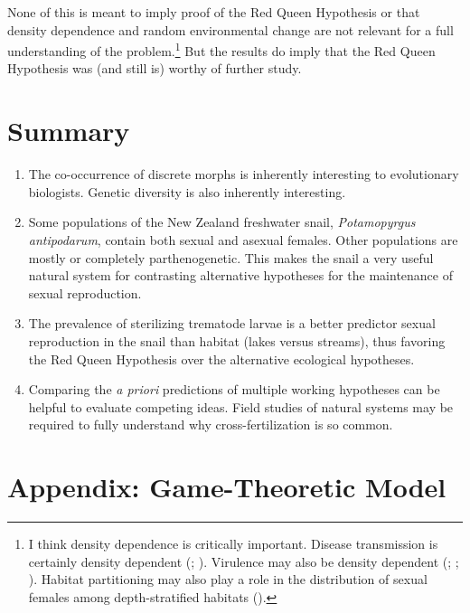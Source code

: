 \documentclass[
  letterpaper,
]{book}
\begin{document}
None of this is meant to imply proof of the Red Queen Hypothesis or that
density dependence and random environmental change are not relevant for
a full understanding of the problem.\footnote{I think density dependence
  is critically important. Disease transmission is certainly density
  dependent (;
  ). Virulence may also be
  density dependent (;
  ;
  ). Habitat partitioning may
  also play a role in the distribution of sexual females among
  depth-stratified habitats ().} But the results do imply that the Red Queen Hypothesis
was (and still is) worthy of further study.

\section{Summary}\label{summary-2}

\begin{enumerate}
\def\labelenumi{\arabic{enumi}.}
\item
  The co-occurrence of discrete morphs is inherently interesting to
  evolutionary biologists. Genetic diversity is also inherently
  interesting.
\item
  Some populations of the New Zealand freshwater snail,
  \emph{Potamopyrgus antipodarum}, contain both sexual and asexual
  females. Other populations are mostly or completely parthenogenetic.
  This makes the snail a very useful natural system for contrasting
  alternative hypotheses for the maintenance of sexual reproduction.
\item
  The prevalence of sterilizing trematode larvae is a better predictor
  sexual reproduction in the snail than habitat (lakes versus streams),
  thus favoring the Red Queen Hypothesis over the alternative ecological
  hypotheses.
\item
  Comparing the \emph{a priori} predictions of multiple working
  hypotheses can be helpful to evaluate competing ideas. Field studies
  of natural systems may be required to fully understand why
  cross-fertilization is so common.
\end{enumerate}

\section{Appendix: Game-Theoretic Model}\label{sec-app-3}
\end{document}
